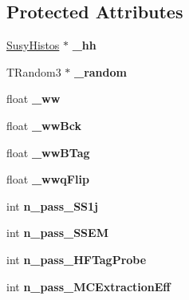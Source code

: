 \subsection*{Protected Attributes}
\begin{DoxyCompactItemize}
\item 
\hypertarget{classSusyFakeAna_a74211b0988cd0d6e69384c7d5e7b501e}{
\hyperlink{classSusyHistos}{SusyHistos} $\ast$ {\bfseries \_\-hh}}
\label{classSusyFakeAna_a74211b0988cd0d6e69384c7d5e7b501e}

\item 
\hypertarget{classSusyFakeAna_aa7db2de4e8cc90a974d7bac6a83a8ea5}{
TRandom3 $\ast$ {\bfseries \_\-random}}
\label{classSusyFakeAna_aa7db2de4e8cc90a974d7bac6a83a8ea5}

\item 
\hypertarget{classSusyFakeAna_adebacecccd686d8eeda48628d39ad875}{
float {\bfseries \_\-ww}}
\label{classSusyFakeAna_adebacecccd686d8eeda48628d39ad875}

\item 
\hypertarget{classSusyFakeAna_acae786b13c0e22f62f30b8c0bfbcd499}{
float {\bfseries \_\-wwBck}}
\label{classSusyFakeAna_acae786b13c0e22f62f30b8c0bfbcd499}

\item 
\hypertarget{classSusyFakeAna_a77d5032ee788d9386daf27250ca98a02}{
float {\bfseries \_\-wwBTag}}
\label{classSusyFakeAna_a77d5032ee788d9386daf27250ca98a02}

\item 
\hypertarget{classSusyFakeAna_a442c949bcd2b7b24dc5d76386c1f8a25}{
float {\bfseries \_\-wwqFlip}}
\label{classSusyFakeAna_a442c949bcd2b7b24dc5d76386c1f8a25}

\item 
\hypertarget{classSusyFakeAna_a05c9ad1013c8ca5c12b4873e2880281a}{
int {\bfseries n\_\-pass\_\-SS1j}}
\label{classSusyFakeAna_a05c9ad1013c8ca5c12b4873e2880281a}

\item 
\hypertarget{classSusyFakeAna_abb428e8585b9e56cd65a6f47595155d7}{
int {\bfseries n\_\-pass\_\-SSEM}}
\label{classSusyFakeAna_abb428e8585b9e56cd65a6f47595155d7}

\item 
\hypertarget{classSusyFakeAna_a33b6bf19a8e416d4f9b203c85274423b}{
int {\bfseries n\_\-pass\_\-HFTagProbe}}
\label{classSusyFakeAna_a33b6bf19a8e416d4f9b203c85274423b}

\item 
\hypertarget{classSusyFakeAna_aa4b4d68942b6a7dd2006c6601d7e1d0a}{
int {\bfseries n\_\-pass\_\-MCExtractionEff}}
\label{classSusyFakeAna_aa4b4d68942b6a7dd2006c6601d7e1d0a}


\end{DoxyCompactItemize}
